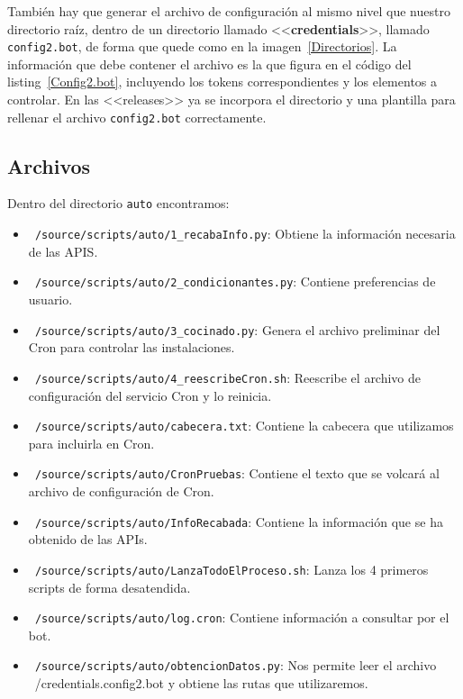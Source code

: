 También hay que generar el archivo de configuración al mismo nivel que nuestro directorio raíz, dentro de un directorio llamado <<\textbf{credentials}>>, llamado \texttt{config2.bot}, de forma que quede como en la imagen~\ref{Directorios}. La información que debe contener el archivo es la que figura en el código del listing~\ref{Config2.bot}, incluyendo los tokens correspondientes y los elementos a controlar.
En las <<releases>> ya se incorpora el directorio y una plantilla para rellenar el archivo \texttt{config2.bot} correctamente.

\subsection{Archivos}
Dentro del directorio \texttt{auto} encontramos:
\begin{itemize}
    \item \texttt{~/source/scripts/auto/1\_recabaInfo.py}: Obtiene la información necesaria de las APIS.
    \item \texttt{~/source/scripts/auto/2\_condicionantes.py}: Contiene preferencias de usuario.
    \item \texttt{~/source/scripts/auto/3\_cocinado.py}: Genera el archivo preliminar del Cron para controlar las instalaciones.
    \item \texttt{~/source/scripts/auto/4\_reescribeCron.sh}: Reescribe el archivo de configuración del servicio Cron y lo reinicia.
    \item \texttt{~/source/scripts/auto/cabecera.txt}: Contiene la cabecera que utilizamos para incluirla en Cron.
    \item \texttt{~/source/scripts/auto/CronPruebas}: Contiene el texto que se volcará al archivo de configuración de Cron.
    \item \texttt{~/source/scripts/auto/InfoRecabada}: Contiene la información que se ha obtenido de las APIs.
    \item \texttt{~/source/scripts/auto/LanzaTodoElProceso.sh}: Lanza los 4 primeros scripts de forma desatendida.
    \item \texttt{~/source/scripts/auto/log.cron}: Contiene información a consultar por el bot.
    \item \texttt{~/source/scripts/auto/obtencionDatos.py}: Nos permite leer el archivo ~/credentials.config2.bot y obtiene las rutas que utilizaremos.
\end{itemize}

